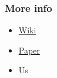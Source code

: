 \documentclass[usepdftitle=false,13pt]{beamer}
\begin{document}
\begin{frame}\frametitle{More info}

	\begin{itemize}
		\item {\color{blue} \href{http://wiki.confine-project.eu/wibed:start}{Wiki}}
		\item {\color{blue} \href{http://wiki.confine-project.eu/_media/wibed:wibed-7pages.pdf}{Paper}}
		\item Us 
	\end{itemize}

\end{frame}

\end{document}
